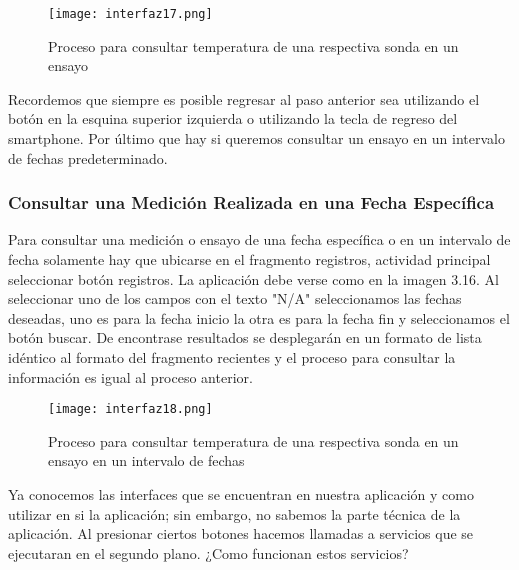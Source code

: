 \begin{figure}[H]
	\centering
	\texttt{[image: interfaz17.png]}
	\caption{Proceso para consultar temperatura de una respectiva sonda en un ensayo}
\end{figure}

\par \noindent
Recordemos que siempre es posible regresar al paso anterior sea utilizando el botón en la esquina superior izquierda o utilizando la tecla de regreso del smartphone. Por último que hay si queremos consultar un ensayo en un intervalo de fechas predeterminado. 

\clearpage

\subsubsection{Consultar una Medición Realizada en una Fecha Específica}

\par 
Para consultar una medición o ensayo de una fecha específica o en un intervalo de fecha solamente hay que ubicarse en el fragmento registros, actividad principal seleccionar botón registros. La aplicación debe verse como en la imagen 3.16. Al seleccionar uno de los campos con el texto "N/A" seleccionamos las fechas deseadas, uno es para la fecha inicio la otra es para la fecha fin y seleccionamos el botón buscar. De encontrase resultados se desplegarán en un formato de lista idéntico al formato del fragmento recientes y el proceso para consultar la información es igual al proceso anterior.

\begin{figure}[H]
	\centering
	\texttt{[image: interfaz18.png]}
	\caption{Proceso para consultar temperatura de una respectiva sonda en un ensayo en un intervalo de fechas}
\end{figure}

\par \noindent
Ya conocemos las interfaces que se encuentran en nuestra aplicación y como utilizar en si la aplicación; sin embargo, no sabemos la parte técnica de la aplicación. Al presionar ciertos botones hacemos llamadas a servicios que se ejecutaran en el segundo plano. ¿Como funcionan estos servicios?
